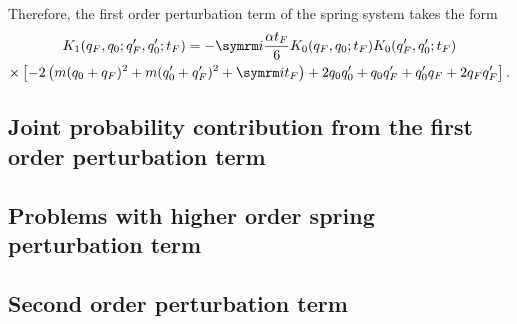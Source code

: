 Therefore, the first order perturbation term of the spring system takes the form
\begin{multline}
    K_1(q_F, q_0; q_F', q_0'; t_F) = -\im\frac{\alpha t_F}{6}K_0(q_F, q_0; t_F)K_0(q_F', q_0'; t_F) \\
    \times\left[-2\left(m(q_0 + q_F)^2 + m(q_0' + q_F')^2 + \im t_F\right) + 2q_0q_0' + q_0q_F' + q_0'q_F + 2q_Fq_F'\right].
\end{multline}

\subsection{Joint probability contribution from the first order perturbation term}

\subsection{Problems with higher order spring perturbation term}

\subsection{Second order perturbation term}

